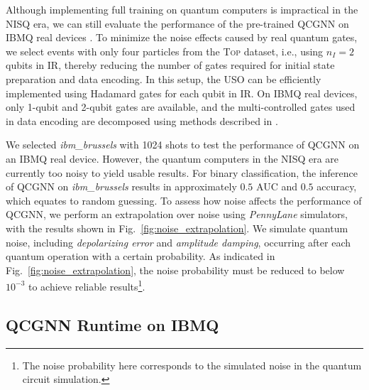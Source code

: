 \documentclass[reprint,amsmath,amssymb,prd,nofootinbib]{revtex4-2}
\newcommand{\PennyLane}{\textit{PennyLane}\xspace}
\newcommand{\Top}{\textsc{Top}\xspace}
\begin{document}
Although implementing full training on quantum computers is impractical in the NISQ era, we can still evaluate the performance of the pre-trained QCGNN on IBMQ real devices \cite{ibmq}. To minimize the noise effects caused by real quantum gates, we select events with only four particles from the \Top dataset, i.e., using $n_I=2$ qubits in IR, thereby reducing the number of gates required for initial state preparation and data encoding. In this setup, the USO can be efficiently implemented using Hadamard gates for each qubit in IR. On IBMQ real devices, only 1-qubit and 2-qubit gates are available, and the multi-controlled gates used in data encoding are decomposed using methods described in \cite{NC}.

We selected \textit{ibm\_brussels} with 1024 shots to test the performance of QCGNN on an IBMQ real device. However, the quantum computers in the NISQ era are currently too noisy to yield usable results. For binary classification, the inference of QCGNN on \textit{ibm\_brussels} results in approximately $0.5$ AUC and $0.5$ accuracy, which equates to random guessing. To assess how noise affects the performance of QCGNN, we perform an extrapolation over noise using \PennyLane simulators, with the results shown in Fig.~\ref{fig:noise_extrapolation}. We simulate quantum noise, including \textit{depolarizing error} and \textit{amplitude damping}, occurring after each quantum operation with a certain probability. As indicated in Fig.~\ref{fig:noise_extrapolation}, the noise probability must be reduced to below $10^{-3}$ to achieve reliable results\footnote{The noise probability here corresponds to the simulated noise in the quantum circuit simulation.}.

\subsection{QCGNN Runtime on IBMQ} \label{sec_runtime}
\end{document}
